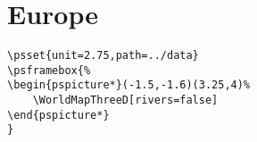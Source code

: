 \documentclass[12pt,a4paper]{article} %
\begin{document}
\section*{Europe}
\begin{verbatim}
\psset{unit=2.75,path=../data}
\psframebox{%
\begin{pspicture*}(-1.5,-1.6)(3.25,4)%
    \WorldMapThreeD[rivers=false]
\end{pspicture*}
}
\end{verbatim}

%
\end{document}
